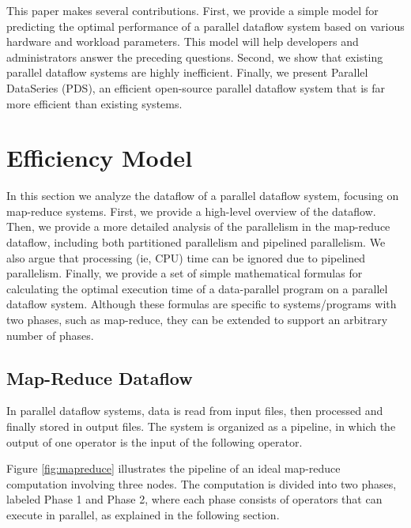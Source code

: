 \documentclass{acm_proc_article-sp}
\begin{document}
This paper makes several contributions. First, we provide a simple model for
predicting the optimal performance of a parallel dataflow system based on
various hardware and workload parameters. This model will help developers and
administrators answer the preceding questions. Second, we show that
existing parallel dataflow systems are highly inefficient. Finally, we present
Parallel DataSeries (PDS), an efficient open-source parallel dataflow system
that is far more efficient than existing systems.

\section{Efficiency Model}

In this section we analyze the dataflow of a parallel dataflow system, focusing
on map-reduce systems. First, we provide a high-level overview of the dataflow.
Then, we provide a more detailed analysis of the parallelism in the map-reduce
dataflow, including both partitioned parallelism and pipelined parallelism. We
also argue that processing (ie, CPU) time can be ignored due to pipelined
parallelism. Finally, we provide a set of simple mathematical formulas for
calculating the optimal execution time of a data-parallel program on a parallel
dataflow system. Although these formulas are specific to systems/programs with
two phases, such as map-reduce, they can be extended to support an arbitrary
number of phases.

\subsection{Map-Reduce Dataflow}

In parallel dataflow systems, data is read from input files, then processed and
finally stored in output files. The system is organized as a pipeline, in which
the output of one operator is the input of the following operator.

\begin{figure*}
\begin{center}
\caption{A map-reduce dataflow.}
\label{fig:mapreduce}
\end{center}
\end{figure*}

Figure \ref{fig:mapreduce} illustrates the pipeline of an ideal map-reduce
computation involving three nodes. The computation is divided into two phases,
labeled Phase 1 and Phase 2, where each phase consists of operators that can
execute in parallel, as explained in the following section.
\end{document}
